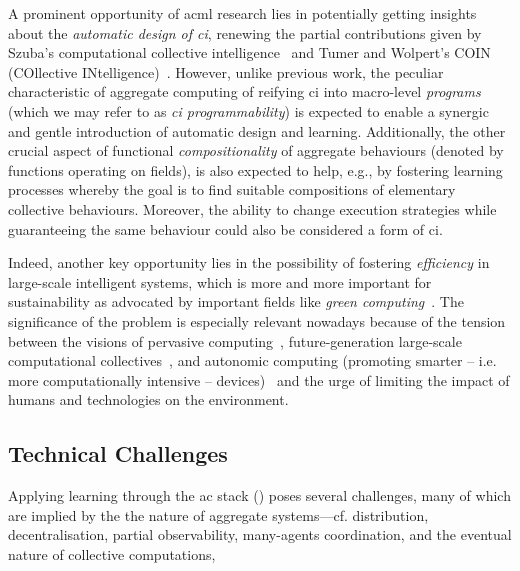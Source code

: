 A prominent opportunity of \ac{acml} research lies 
 in potentially getting insights 
 about the \emph{automatic design 
 of \acf{ci}},
 renewing the partial contributions
 given by Szuba's computational collective intelligence~\cite{DBLP:journals/fgcs/Szuba01}
 and Tumer and Wolpert's COIN (COllective INtelligence)~\cite{DBLP:journals/jair/WolpertT02}.
%
However, unlike previous work, 
 the peculiar characteristic of aggregate computing 
 of reifying \ac{ci} into macro-level \emph{programs}
 (which we may refer to as \emph{\ac{ci} programmability})
 is expected to enable a synergic and gentle introduction of automatic design and learning.
%
Additionally, the other crucial aspect of
 functional \emph{compositionality} of aggregate behaviours (denoted by functions operating on fields),
 is also expected to help, e.g.,
 by fostering learning processes
 whereby the goal is to find suitable
 compositions of elementary collective behaviours.
%
Moreover, the ability to change execution strategies while guaranteeing the same behaviour could also be considered a form of \ac{ci}.

Indeed, another key opportunity 
 lies in the possibility of fostering \emph{efficiency}
 in large-scale intelligent systems,
 which is more and more important
 for sustainability
 as advocated by important fields
 like \emph{green computing}~\cite{DBLP:journals/iet-net/SarkarM16}.
%
The significance of the problem 
 is especially relevant nowadays because
 of the tension between
 the visions of pervasive computing~\cite{DBLP:journals/computer/SahaM03}, future-generation large-scale computational collectives~\cite{DBLP:journals/eaai/CasadeiVAPD21}, and autonomic computing (promoting smarter -- i.e. more computationally intensive -- devices)~\cite{DBLP:journals/computer/KephartC03}
 and the urge of limiting the impact
 of humans and technologies on the environment.
%
\subsection*{Technical Challenges}

Applying learning through the \ac{ac} stack () poses several challenges,
 many of which are implied by the 
 the nature of aggregate systems---cf.
 distribution, 
 decentralisation, 
 partial observability,
 many-agents coordination, and
 the eventual nature of collective computations,
  

